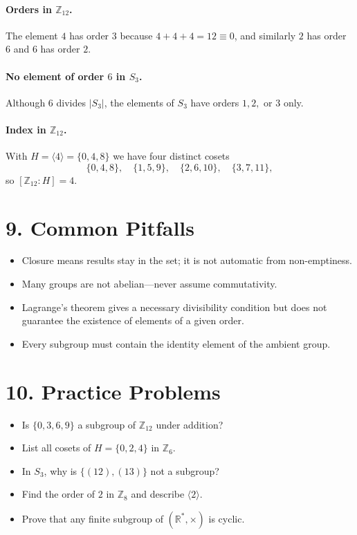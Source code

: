 \documentclass[12pt]{article}
\begin{document}
\paragraph{Orders in $\mathbb{Z}_{12}$.}
The element $4$ has order $3$ because $4+4+4=12\equiv0$, and similarly $2$ has order $6$ and $6$ has order $2$.

\paragraph{No element of order $6$ in $S_3$.}
Although $6$ divides $|S_3|$, the elements of $S_3$ have orders $1,2,$ or $3$ only.

\paragraph{Index in $\mathbb{Z}_{12}$.}
With $H=\langle4\rangle=\{0,4,8\}$ we have four distinct cosets
\[
\{0,4,8\},\quad \{1,5,9\},\quad \{2,6,10\},\quad \{3,7,11\},
\]
so $[\mathbb{Z}_{12}:H]=4$.

\section*{9. Common Pitfalls}
\begin{itemize}
  \item Closure means results stay in the set; it is not automatic from non-emptiness.
  \item Many groups are not abelian—never assume commutativity.
  \item Lagrange's theorem gives a necessary divisibility condition but does not guarantee the existence of elements of a given order.
  \item Every subgroup must contain the identity element of the ambient group.
\end{itemize}

\section*{10. Practice Problems}
\begin{itemize}
  \item Is $\{0,3,6,9\}$ a subgroup of $\mathbb{Z}_{12}$ under addition?
  \item List all cosets of $H=\{0,2,4\}$ in $\mathbb{Z}_6$.
  \item In $S_3$, why is $\{(12),(13)\}$ not a subgroup?
  \item Find the order of $2$ in $\mathbb{Z}_8$ and describe $\langle2\rangle$.
  \item Prove that any finite subgroup of $(\mathbb{R}^*,\times)$ is cyclic.
\end{itemize}
\end{document}
